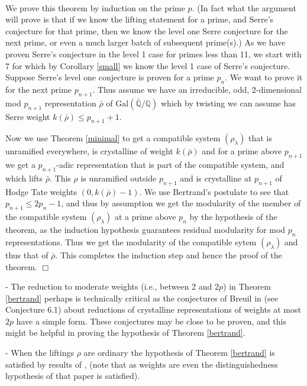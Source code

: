 \documentclass[12pt]{article}
\newenvironment{proof}{\smallskip\noindent{\bf Proof.}\
}{$\Box$\smallskip\goodbreak}
\def\rhob{ {\bar {\rho} } }
\newcommand{\Galois}{\mathrm{Gal}}
\newcommand{\Gal}{\Galois( \bar{ {\mathbb Q}}/{\mathbb Q})}
\begin{document}
\begin{proof}

We prove this theorem by induction on the prime $p$. (In fact what the
argument
will prove is that if we know the lifting
statement for a prime, and Serre's conjecture for that prime, then we know
the
level one Serre conjecture for the next prime, or even a much larger batch
of
subsequent prime(s).)
As we have proven Serre's conjecture in the level 1 case for primes less
than
11, we start with 7 for which by Corollary \ref{small} we know
the level 1 case of Serre's conjecture. Suppose
Serre's level one conjecture is proven for a prime $p_n$. We want to prove
it
for the next prime
$p_{n+1}$. Thus assume we have an irreducible, odd, 2-dimensional mod
$p_{n+1}$
representation $\rhob$ of $\Gal$ which by twisting we can assume
has Serre weight $k(\rhob) \leq p_{n+1}+1$.


Now we use Theorem \ref{minimal} to get a compatible system
$(\rho_\lambda)$
that is unramified everywhere, is crystalline of weight $k(\rhob)$ and for a
prime above $p_{n+1}$  we get a $p_{n+1}$-adic representation
that is part of the compatible system, and which lifts $\rhob$. This $\rho$
is
unramified outside $p_{n+1}$ and is crystalline at $p_{n+1}$ of Hodge Tate
weights $(0,k(\rhob)-1)$. We use Bertrand's postulate to see that $p_{n+1}
\leq
2p_n-1$, and thus by assumption we get the modularity
of the member of the compatible system $(\rho_\lambda)$ at a prime above
$p_n$
by the hypothesis of the theorem, as the induction hypothesis guarantees
residual modularity for mod $p_n$ representations. Thus we get the
modularity of
the compatible sytem $(\rho_\lambda)$ and thus that of
$\rhob$. This completes the induction step and hence the proof of the
theorem.
\end{proof}



- The reduction to moderate weights (i.e., between 2 and $2p$)
in Theorem \ref{bertrand}
perhaps is technically critical as the conjectures of Breuil
in \cite{Breuil} (see Conjecture 6.1)
about reductions of crystalline representations of weights at most $2p$ have
a
simple form. These
conjectures may be close to be proven, and this might be helpful in proving
the
hypothesis of Theorem \ref{bertrand}.

- When the liftings $\rho$ are ordinary the hypothesis of Theorem
\ref{bertrand} is satisfied by results of \cite{Wiles}, \cite{SW2} (note
that as
weights are
even
the distinguishedness hypothesis of that paper is satisfied).
\end{document}
